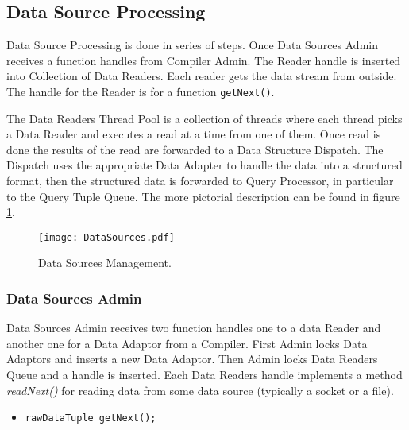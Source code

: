 \documentclass[11pt]{article}
\begin{document}
\subsection{Data Source Processing}

Data Source Processing is done in series of steps. Once Data Sources Admin receives a function handles from Compiler Admin. The Reader handle is inserted into Collection of Data Readers. Each reader gets the data stream from outside. The handle for the Reader is for a function {\tt getNext()}.

The Data Readers Thread Pool is a collection of threads where each thread picks a Data Reader and executes a read at a time from one of them. Once read is done the results of the read are forwarded to a Data Structure Dispatch. The Dispatch uses the appropriate Data Adapter to handle the data into a structured format, then the structured data is forwarded to Query Processor, in particular to the Query Tuple Queue. The more pictorial description can be found in figure \ref{DataSourcePic}.


\begin{figure}
  \texttt{[image: DataSources.pdf]}
  \caption{Data Sources Management.}
  \label{DataSourcePic}
\end{figure}

\subsubsection{Data Sources Admin}

Data Sources Admin receives two function handles one to a data Reader and another one for a Data Adaptor from a Compiler. First Admin locks Data Adaptors and inserts a new Data Adaptor. Then Admin locks Data Readers Queue  and a handle is inserted. Each Data Readers handle implements a method \emph{readNext()} for reading data from some data source (typically a socket or a file).

\begin{itemize}
	\item {\tt rawDataTuple getNext();}
\end{itemize}
\end{document}
